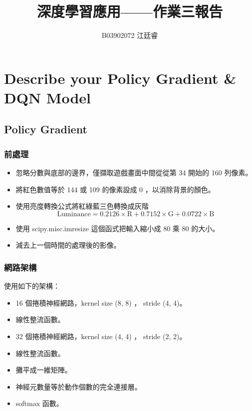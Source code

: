 \documentclass[fleqn,a4paper,12pt]{article}
\title{深度學習應用——作業三報告}
\author{B03902072 江廷睿}
\date{}
\begin{document}
\maketitle
\thispagestyle{fancy}

\section{Describe your Policy Gradient \& DQN Model}

\subsection{Policy Gradient}

\subsubsection*{前處理}

\begin{itemize}
\item 忽略分數與底部的邊界，僅擷取遊戲畫面中間從從第 34 開始的 160 列像素。
\item 將紅色數值等於 144 或 109 的像素設成 0 ，以消除背景的顏色。
\item 使用亮度轉換公式將紅綠藍三色轉換成灰階
  \begin{equation*}
    \text{Luminance} = 0.2126 \times \text{R} + 0.7152 \times \text{G} + 0.0722 \times \text{B}    
  \end{equation*}
\item 使用 scipy.misc.imresize 這個函式把輸入縮小成 80 乘 80 的大小。
\item 減去上一個時間的處理後的影像。
\end{itemize}


\subsubsection*{網路架構}

使用如下的架構：

\begin{itemize}
\item 16 個捲積神經網路，kernel size (8, 8) ， stride (4, 4)。
\item 線性整流函數。
\item 32 個捲積神經網路，kernel size (4, 4) ， stride (2, 2)。
\item 線性整流函數。
\item 攤平成一維矩陣。
\item 神經元數量等於動作個數的完全連接層。
\item softmax 函數。
\end{itemize}
\end{document}
